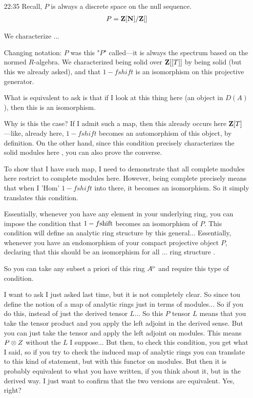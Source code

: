 \begin{unfinished}{22:35}
Recall, $P$ is always a discrete space on the null sequence. 
\begin{align*}
P = \mathbf Z[\mathbf N] / \mathbf Z[]
\end{align*}

We characterize ...

%
Changing notation: $P$ was this "$P$" called---it is always the spectrum based on the normed $R$-algebra. We characterized being solid over $\mathbf Z[[T]]$ by being solid (but this we already asked), and that $1-f shift$ is an isomorphism on this projective generator.

What is equivalent to ask is that if I look at this thing here (an object in ${D}(A)$), then this is an isomorphism.


Why is this the case? If I admit such a map, then this already occurs here $\mathbf Z[T]$ ---like, already here, $1-f shift$ becomes an automorphism of this object, by definition.
On the other hand, since this condition precisely characterizes the solid modules here , you can also prove the converse.

To show that I have such map, I need to demonstrate that all complete modules here restrict to complete modules here. 
However, being complete precisely means that when I 'Hom'  $1-f shift$ into there, it becomes an isomorphism. So it simply translates this condition.

% 
Essentially, whenever you have any element in your underlying ring, you can impose the condition that $1-f \mathrm{shift}$ becomes an isomorphism of $P$. 
This condition will define an analytic ring structure by this general... 
Essentially, whenever you have an endomorphism of your compact projective object $P$, declaring that this should be an isomorphism for all ... ring structure .

So you can take any subset a priori of this ring $A^\triangleright$ and require this  type of condition.

\ques I want to ask I just asked last time, but it is not completely clear. So since tou define the notion of a map of analytic rings just in terms of modules... So if you do this, instead of just the derived tensor $L$... So this $P$ tensor $L$ means that you take the tensor product and you apply the left adjoint in the derived sense. But you can just take the tensor and apply the left adjoint on modules. This means $P \otimes Z$ without the $L$ I suppose... But then, to check this condition, you get what I said, so if you try to check the induced map of analytic rings you can translate to this kind of statement, but with this functor on modules. 
But then it is probably equivalent to what you have written, if you think about it, but in the derived way. I just want to confirm that the two versions are equivalent. Yes, right? 


\end{unfinished}
